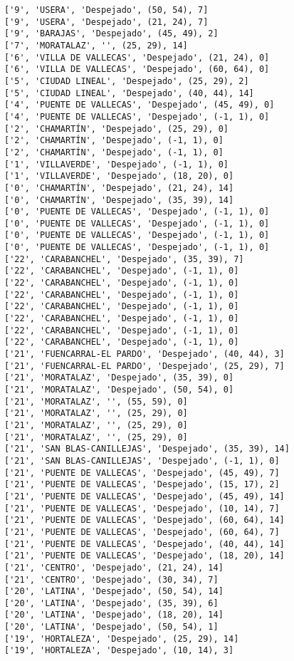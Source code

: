 \documentclass[11pt]{article}
\begin{document}
\begin{Verbatim}[commandchars=\\\{\}]
['9', 'USERA', 'Despejado', (50, 54), 7]
['9', 'USERA', 'Despejado', (21, 24), 7]
['9', 'BARAJAS', 'Despejado', (45, 49), 2]
['7', 'MORATALAZ', '', (25, 29), 14]
['6', 'VILLA DE VALLECAS', 'Despejado', (21, 24), 0]
['6', 'VILLA DE VALLECAS', 'Despejado', (60, 64), 0]
['5', 'CIUDAD LINEAL', 'Despejado', (25, 29), 2]
['5', 'CIUDAD LINEAL', 'Despejado', (40, 44), 14]
['4', 'PUENTE DE VALLECAS', 'Despejado', (45, 49), 0]
['4', 'PUENTE DE VALLECAS', 'Despejado', (-1, 1), 0]
['2', 'CHAMARTÍN', 'Despejado', (25, 29), 0]
['2', 'CHAMARTÍN', 'Despejado', (-1, 1), 0]
['2', 'CHAMARTÍN', 'Despejado', (-1, 1), 0]
['1', 'VILLAVERDE', 'Despejado', (-1, 1), 0]
['1', 'VILLAVERDE', 'Despejado', (18, 20), 0]
['0', 'CHAMARTÍN', 'Despejado', (21, 24), 14]
['0', 'CHAMARTÍN', 'Despejado', (35, 39), 14]
['0', 'PUENTE DE VALLECAS', 'Despejado', (-1, 1), 0]
['0', 'PUENTE DE VALLECAS', 'Despejado', (-1, 1), 0]
['0', 'PUENTE DE VALLECAS', 'Despejado', (-1, 1), 0]
['0', 'PUENTE DE VALLECAS', 'Despejado', (-1, 1), 0]
['22', 'CARABANCHEL', 'Despejado', (35, 39), 7]
['22', 'CARABANCHEL', 'Despejado', (-1, 1), 0]
['22', 'CARABANCHEL', 'Despejado', (-1, 1), 0]
['22', 'CARABANCHEL', 'Despejado', (-1, 1), 0]
['22', 'CARABANCHEL', 'Despejado', (-1, 1), 0]
['22', 'CARABANCHEL', 'Despejado', (-1, 1), 0]
['22', 'CARABANCHEL', 'Despejado', (-1, 1), 0]
['22', 'CARABANCHEL', 'Despejado', (-1, 1), 0]
['21', 'FUENCARRAL-EL PARDO', 'Despejado', (40, 44), 3]
['21', 'FUENCARRAL-EL PARDO', 'Despejado', (25, 29), 7]
['21', 'MORATALAZ', 'Despejado', (35, 39), 0]
['21', 'MORATALAZ', 'Despejado', (50, 54), 0]
['21', 'MORATALAZ', '', (55, 59), 0]
['21', 'MORATALAZ', '', (25, 29), 0]
['21', 'MORATALAZ', '', (25, 29), 0]
['21', 'MORATALAZ', '', (25, 29), 0]
['21', 'SAN BLAS-CANILLEJAS', 'Despejado', (35, 39), 14]
['21', 'SAN BLAS-CANILLEJAS', 'Despejado', (-1, 1), 0]
['21', 'PUENTE DE VALLECAS', 'Despejado', (45, 49), 7]
['21', 'PUENTE DE VALLECAS', 'Despejado', (15, 17), 2]
['21', 'PUENTE DE VALLECAS', 'Despejado', (45, 49), 14]
['21', 'PUENTE DE VALLECAS', 'Despejado', (10, 14), 7]
['21', 'PUENTE DE VALLECAS', 'Despejado', (60, 64), 14]
['21', 'PUENTE DE VALLECAS', 'Despejado', (60, 64), 7]
['21', 'PUENTE DE VALLECAS', 'Despejado', (40, 44), 14]
['21', 'PUENTE DE VALLECAS', 'Despejado', (18, 20), 14]
['21', 'CENTRO', 'Despejado', (21, 24), 14]
['21', 'CENTRO', 'Despejado', (30, 34), 7]
['20', 'LATINA', 'Despejado', (50, 54), 14]
['20', 'LATINA', 'Despejado', (35, 39), 6]
['20', 'LATINA', 'Despejado', (18, 20), 14]
['20', 'LATINA', 'Despejado', (50, 54), 1]
['19', 'HORTALEZA', 'Despejado', (25, 29), 14]
['19', 'HORTALEZA', 'Despejado', (10, 14), 3]

\end{Verbatim}
\end{document}
